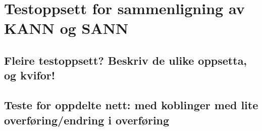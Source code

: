 \section{Testoppsett for sammenligning av KANN og SANN}
	\subsection{Fleire testoppsett? Beskriv de ulike oppsetta, og kvifor!}
	\subsection{Teste for oppdelte nett: med koblinger med lite overføring/endring i overføring}
